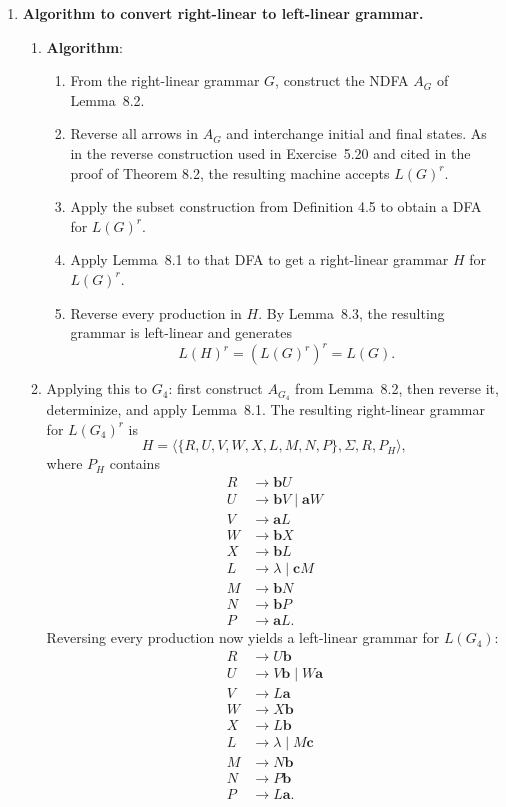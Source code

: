 \begin{enumerate}[{8.}1. ]
\item \textbf{Algorithm to convert right-linear to left-linear grammar.}

\begin{enumerate}
\item \textbf{Algorithm}:
\begin{enumerate}
\item From the right-linear grammar $G$, construct the NDFA $A_G$ of
Lemma~8.2.

\item Reverse all arrows in $A_G$ and interchange initial and final states.  As
in the reverse construction used in Exercise~5.20 and cited in the proof of
Theorem 8.2, the resulting machine accepts $L(G)^r$.

\item Apply the subset construction from Definition 4.5 to obtain a
DFA for $L(G)^r$.

\item Apply Lemma~8.1 to that DFA to get a right-linear grammar $H$ for
$L(G)^r$.

\item Reverse every production in $H$.  By Lemma~8.3, the resulting grammar is
left-linear and generates
\[
L(H)^r=(L(G)^r)^r=L(G).
\]
\end{enumerate}

\item Applying this to $G_4$: first construct $A_{G_4}$ from Lemma~8.2, then
reverse it, determinize, and apply Lemma~8.1.  The resulting right-linear
grammar for $L(G_4)^r$ is
\[
H=\langle\{R,U,V,W,X,L,M,N,P\},\Sigma,R,P_H\rangle,
\]
where $P_H$ contains
\[
\begin{aligned}
R&\to \pmb{b}U\\
U&\to \pmb{b}V\mid \pmb{a}W\\
V&\to \pmb{a}L\\
W&\to \pmb{b}X\\
X&\to \pmb{b}L\\
L&\to \lambda\mid \pmb{c}M\\
M&\to \pmb{b}N\\
N&\to \pmb{b}P\\
P&\to \pmb{a}L.
\end{aligned}
\]
Reversing every production now yields a left-linear grammar for $L(G_4)$:
\[
\begin{aligned}
R&\to U\pmb{b}\\
U&\to V\pmb{b}\mid W\pmb{a}\\
V&\to L\pmb{a}\\
W&\to X\pmb{b}\\
X&\to L\pmb{b}\\
L&\to \lambda\mid M\pmb{c}\\
M&\to N\pmb{b}\\
N&\to P\pmb{b}\\
P&\to L\pmb{a}.
\end{aligned}
\]
\end{enumerate}


\end{enumerate}
